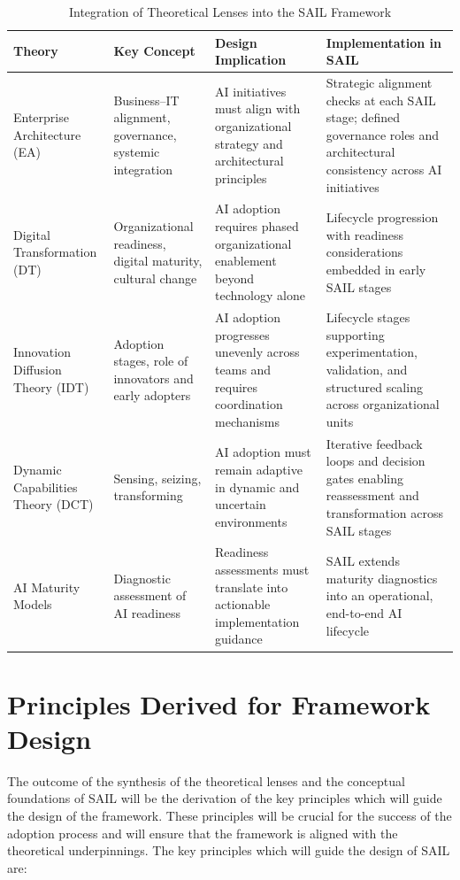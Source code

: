 \documentclass[]{imc-inf}
\begin{document}
\begin{table}[htbp]
\centering
\caption{Integration of Theoretical Lenses into the SAIL Framework}
\label{tab:theoretical_integration_sail}
\begin{tabular}{p{3.2cm} p{3.2cm} p{4.2cm} p{4.2cm}}
\hline
\textbf{Theory} & \textbf{Key Concept} & \textbf{Design Implication} & \textbf{Implementation in SAIL} \\
\hline
Enterprise Architecture (EA) &
Business--IT alignment, governance, systemic integration &
AI initiatives must align with organizational strategy and architectural principles &
Strategic alignment checks at each SAIL stage; defined governance roles and architectural consistency across AI initiatives \\

Digital Transformation (DT) &
Organizational readiness, digital maturity, cultural change &
AI adoption requires phased organizational enablement beyond technology alone &
Lifecycle progression with readiness considerations embedded in early SAIL stages \\

Innovation Diffusion Theory (IDT) &
Adoption stages, role of innovators and early adopters &
AI adoption progresses unevenly across teams and requires coordination mechanisms &
Lifecycle stages supporting experimentation, validation, and structured scaling across organizational units \\

Dynamic Capabilities Theory (DCT) &
Sensing, seizing, transforming &
AI adoption must remain adaptive in dynamic and uncertain environments &
Iterative feedback loops and decision gates enabling reassessment and transformation across SAIL stages \\

AI Maturity Models &
Diagnostic assessment of AI readiness &
Readiness assessments must translate into actionable implementation guidance &
SAIL extends maturity diagnostics into an operational, end-to-end AI lifecycle \\
\hline
\end{tabular}
\end{table}


\section{Principles Derived for Framework
	Design}\label{principles-derived-for-framework-design}

The outcome of the synthesis of the theoretical lenses and the
conceptual foundations of SAIL will be the derivation of the key
principles which will guide the design of the framework. These
principles will be crucial for the success of the adoption process and
will ensure that the framework is aligned with the theoretical
underpinnings. The key principles which will guide the design of SAIL
are:
\end{document}
